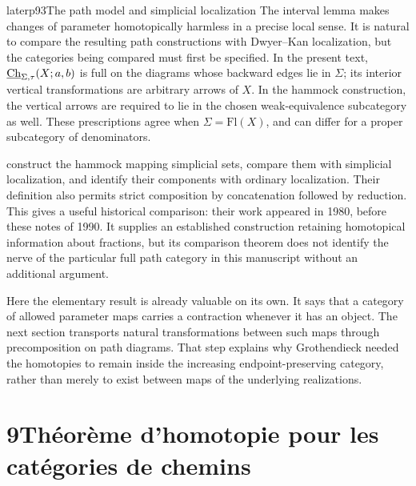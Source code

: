 \begin{dcomment}{later}{p93}{The path model and simplicial localization}
The interval lemma makes changes of parameter homotopically harmless in a precise local sense. It is natural to compare the resulting path constructions with Dwyer--Kan localization, but the categories being compared must first be specified. In the present text, $\underline{\mathrm{Ch}}_{\Sigma,\tau}(X;a,b)$ is full on the diagrams whose backward edges lie in $\Sigma$; its interior vertical transformations are arbitrary arrows of $X$. In the hammock construction, the vertical arrows are required to lie in the chosen weak-equivalence subcategory as well. These prescriptions agree when $\Sigma=\mathrm{Fl}(X)$, and can differ for a proper subcategory of denominators.

\citet[Definition~2.1, Proposition~2.2 and Proposition~3.1]{DwyerKan1980Calculating} construct the hammock mapping simplicial sets, compare them with simplicial localization, and identify their components with ordinary localization. Their definition also permits strict composition by concatenation followed by reduction. This gives a useful historical comparison: their work appeared in 1980, before these notes of 1990. It supplies an established construction retaining homotopical information about fractions, but its comparison theorem does not identify the nerve of the particular full path category in this manuscript without an additional argument.

Here the elementary result is already valuable on its own. It says that a category of allowed parameter maps carries a contraction whenever it has an object. The next section transports natural transformations between such maps through precomposition on path diagrams. That step explains why Grothendieck needed the homotopies to remain inside the increasing endpoint-preserving category, rather than merely to exist between maps of the underlying realizations.
\end{dcomment}


\section*{9\quad Théorème d'homotopie pour les catégories de chemins}

